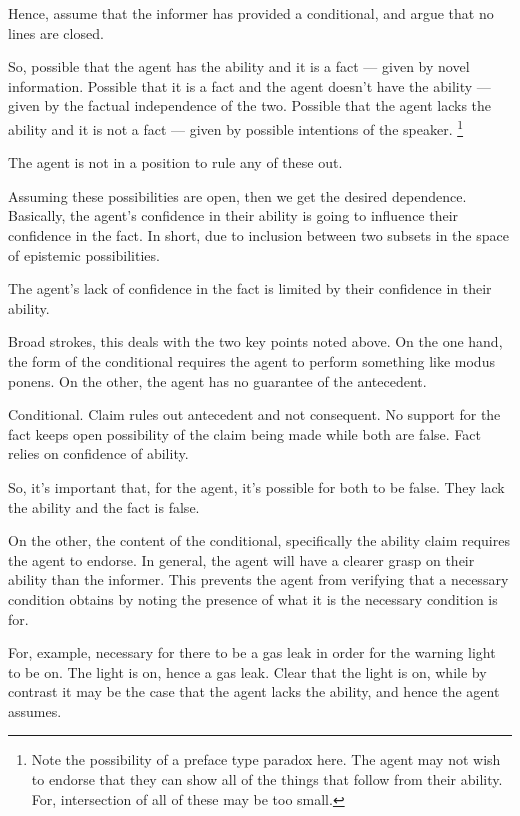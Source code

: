\documentclass[10pt]{article}
\begin{document}
Hence, assume that the informer has provided a conditional, and argue that no lines are closed.

So, possible that the agent has the ability and it is a fact --- given by novel information.
Possible that it is a fact and the agent doesn't have the ability --- given by the factual independence of the two.
Possible that the agent lacks the ability and it is not a fact --- given by possible intentions of the speaker.\nolinebreak
\footnote{
  Note the possibility of a preface type paradox here.
  The agent may not wish to endorse that they can show all of the things that follow from their ability.
  For, intersection of all of these may be too small.
}

The agent is not in a position to rule any of these out.

Assuming these possibilities are open, then we get the desired dependence.
Basically, the agent's confidence in their ability is going to influence their confidence in the fact.
In short, due to inclusion between two subsets in the space of epistemic possibilities.

The agent's lack of confidence in the fact is limited by their confidence in their ability.

Broad strokes, this deals with the two key points noted above.
On the one hand, the form of the conditional requires the agent to perform something like modus ponens.
On the other, the agent has no guarantee of the antecedent.

Conditional.
Claim rules out antecedent and not consequent.
No support for the fact keeps open possibility of the claim being made while both are false.
Fact relies on confidence of ability.

So, it's important that, for the agent, it's possible for both to be false.
They lack the ability and the fact is false.

On the other, the content of the conditional, specifically the ability claim requires the agent to endorse.
In general, the agent will have a clearer grasp on their ability than the informer.
This prevents the agent from verifying that a necessary condition obtains by noting the presence of what it is the necessary condition is for.

For, example, necessary for there to be a gas leak in order for the warning light to be on.
The light is on, hence a gas leak.
Clear that the light is on, while by contrast it may be the case that the agent lacks the ability, and hence the agent assumes.
\end{document}

